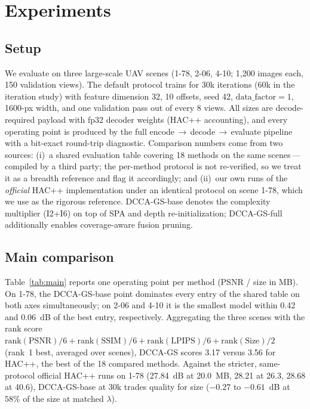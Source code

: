 \documentclass[conference]{IEEEtran}
\newcommand{\DCCA}{DCCA-GS}
\begin{document}
\section{Experiments}
\label{sec:experiments}

\subsection{Setup}
We evaluate on three large-scale UAV scenes (1-78, 2-06, 4-10; 1{,}200 images
each, 150 validation views). The default protocol trains for 30k iterations
(60k in the iteration study) with feature dimension 32, 10 offsets, seed 42,
$\mathrm{data\_factor}{=}1$, 1600-px width, and one validation pass out of
every 8 views. All sizes are decode-required payload with fp32 decoder weights
(HAC++ accounting), and every operating point is produced by the full
encode\,$\to$\,decode\,$\to$\,evaluate pipeline with a bit-exact round-trip
diagnostic. Comparison numbers come from two sources: (i)~a shared evaluation
table covering 18 methods on the same scenes\,—\,compiled by a third party;
the per-method protocol is not re-verified, so we treat it as a breadth
reference and flag it accordingly; and (ii)~our own runs of the
\emph{official} HAC++ implementation under an identical protocol on scene
1-78, which we use as the rigorous reference. \DCCA{}-base denotes the
complexity multiplier (I2+I6) on top of SPA and depth re-initialization;
\DCCA{}-full additionally enables coverage-aware fusion pruning.

\subsection{Main comparison}
Table~\ref{tab:main} reports one operating point per method (PSNR / size in
MB). On 1-78, the \DCCA{}-base point dominates every entry of the shared
table on both axes simultaneously; on 2-06 and 4-10 it is the smallest model
within 0.42 and 0.06~dB of the best entry, respectively. Aggregating the
three scenes with the rank score
$\mathrm{rank}(\mathrm{PSNR})/6+\mathrm{rank}(\mathrm{SSIM})/6+
\mathrm{rank}(\mathrm{LPIPS})/6+\mathrm{rank}(\mathrm{Size})/2$ (rank~1
best, averaged over scenes), \DCCA{} scores 3.17 versus 3.56 for HAC++, the
best of the 18 compared methods. Against the stricter, same-protocol
official HAC++ runs on 1-78 (27.84~dB at 20.0~MB, 28.21 at 26.3, 28.68 at
40.6), \DCCA{}-base at 30k trades quality for size
($-0.27$ to $-0.61$~dB at $58\%$ of the size at matched $\lambda$).
\end{document}
